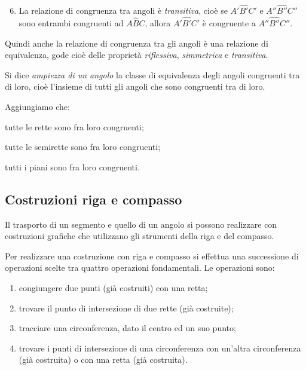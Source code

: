 \begin{enumerate}[label=\Roman{*}.]
\setcounter{enumi}{5}
\item La relazione di congruenza tra angoli è \emph{transitiva}, cioè 
se $A'\widehat{B'}C'$ e $A''\widehat{B''}C''$ sono entrambi 
congruenti ad $A\widehat{B}C$, allora $A'\widehat{B'}C'$ è congruente 
a $A''\widehat{B''}C''$.
\end{enumerate}

Quindi anche la relazione di congruenza tra gli angoli è una 
relazione di equivalenza, gode cioè delle proprietà 
\emph{riflessiva}, \emph{simmetrica} e \emph{transitiva}.

\begin{definizione}
Si dice \emph{ampiezza di un angolo} la classe di equivalenza degli 
angoli congruenti tra di loro, cioè l'insieme di tutti gli angoli che 
sono congruenti tra di loro.
\end{definizione}

Aggiungiamo che:
\begin{itemize*}
\item tutte le rette sono fra loro congruenti;
\item tutte le semirette sono fra loro congruenti;
\item tutti i piani sono fra loro congruenti.
\end{itemize*}

\subsection{Costruzioni riga e compasso}

Il trasporto di un segmento e quello di un angolo si possono realizzare con 
costruzioni grafiche che utilizzano gli strumenti della riga e del compasso.

Per realizzare una costruzione con riga e compasso si effettua una successione
di operazioni scelte tra quattro operazioni fondamentali. 
Le operazioni sono:
\begin{enumerate} [nosep]
  \item 
congiungere due punti (già costruiti) con una retta;
  \item 
trovare il punto di intersezione di due rette (già costruite);
  \item 
tracciare una circonferenza, dato il centro ed un suo punto;
  \item 
trovare i punti di intersezione di una circonferenza con un'altra 
circonferenza (già costruita) o con una retta (già costruita).
\end{enumerate}

